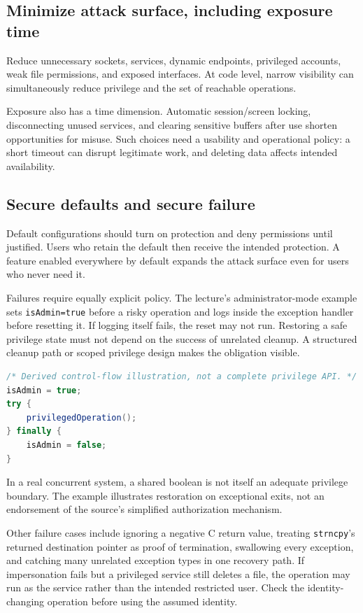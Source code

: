 \documentclass[11pt,a4paper]{article}
\numberwithin{figure}{section}
\begin{document}
\subsection{Minimize attack surface, including exposure time}
Reduce unnecessary sockets, services, dynamic endpoints, privileged accounts, weak file permissions, and exposed interfaces. At code level, narrow visibility can simultaneously reduce privilege and the set of reachable operations.

Exposure also has a time dimension. Automatic session/screen locking, disconnecting unused services, and clearing sensitive buffers after use shorten opportunities for misuse. Such choices need a usability and operational policy: a short timeout can disrupt legitimate work, and deleting data affects intended availability.

\subsection{Secure defaults and secure failure}
Default configurations should turn on protection and deny permissions until justified. Users who retain the default then receive the intended protection. A feature enabled everywhere by default expands the attack surface even for users who never need it.

Failures require equally explicit policy. The lecture's administrator-mode example sets \texttt{isAdmin=true} before a risky operation and logs inside the exception handler before resetting it. If logging itself fails, the reset may not run. Restoring a safe privilege state must not depend on the success of unrelated cleanup. A structured cleanup path or scoped privilege design makes the obligation visible.

\begin{lstlisting}[language=Java]
/* Derived control-flow illustration, not a complete privilege API. */
isAdmin = true;
try {
    privilegedOperation();
} finally {
    isAdmin = false;
}
\end{lstlisting}
In a real concurrent system, a shared boolean is not itself an adequate privilege boundary. The example illustrates restoration on exceptional exits, not an endorsement of the source's simplified authorization mechanism.

Other failure cases include ignoring a negative C return value, treating \texttt{strncpy}'s returned destination pointer as proof of termination, swallowing every exception, and catching many unrelated exception types in one recovery path. If impersonation fails but a privileged service still deletes a file, the operation may run as the service rather than the intended restricted user. Check the identity-changing operation before using the assumed identity.
\end{document}

